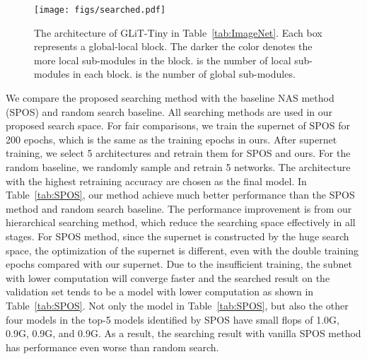 \documentclass[10pt,twocolumn,letterpaper]{article}
\begin{document}
\begin{figure*}[htbp]
	\centering
	\texttt{[image: figs/searched.pdf]}\\
	\caption{The architecture of GLiT-Tiny in Table~\ref{tab:ImageNet}. Each box represents a global-local block. The darker the color denotes the more local sub-modules in the block.  is the number of local sub-modules in each block.  is the number of global sub-modules.}
	\label{fig:search}
	 \vspace{-12pt}
\end{figure*}
We compare the proposed searching method with the baseline NAS method (SPOS) and random search baseline. All searching methods are used in our proposed search space. For fair comparisons, we train the supernet of SPOS for 200 epochs, which is the same as the training epochs in ours. After supernet training, we select 5 architectures and retrain them for SPOS and ours. For the random baseline, we randomly sample and retrain 5 networks. The architecture with the highest retraining accuracy are chosen as the final model.
In Table~\ref{tab:SPOS}, our method achieve much better performance than the SPOS method and random search baseline. The performance improvement is from our hierarchical searching method, which reduce the searching space effectively in all stages. 
For SPOS method, since the supernet is constructed by the huge search space, the optimization of the supernet is different, even with the double training epochs compared with our supernet. Due to the insufficient training, the subnet with lower computation will converge faster and the searched result on the validation set tends to be a model with lower computation as shown in Table~\ref{tab:SPOS}. Not only the model in Table~\ref{tab:SPOS}, but also the other four models in the top-5 models identified by SPOS have small flops of 1.0G, 0.9G, 0.9G, and 0.9G. As a result, the searching result with vanilla SPOS method has performance even worse than random search. 

\begin{table}[H]
	\centering
	\caption{Performance comparisons between SPOS, Random searching baseline, and our searching method on ImageNet.}
	\centering
	 \vspace{-12pt}
	\label{tab:SPOS} 
\end{table}
\end{document}

